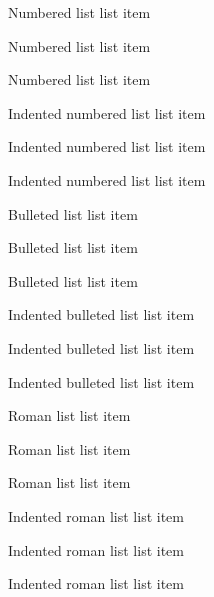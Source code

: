 \begin{numberedlist}
	\item Numbered list list item
    \item Numbered list list item
    \item Numbered list list item
\end{numberedlist}

\begin{numberedlist-indent}
	\item Indented numbered list list item
	\item Indented numbered list list item
	\item Indented numbered list list item
\end{numberedlist-indent}

\begin{bulletlist}
	\item Bulleted list list item
    \item Bulleted list list item
    \item Bulleted list list item
\end{bulletlist}

\begin{bulletlist-indent}
    \item Indented bulleted list list item
    \item Indented bulleted list list item
    \item Indented bulleted list list item
\end{bulletlist-indent}


\begin{romanlist}
    \item Roman list list item
    \item Roman list list item
    \item Roman list list item
\end{romanlist}

\begin{romanlist-indent}
    \item Indented roman list list item
    \item Indented roman list list item
    \item Indented roman list list item
\end{romanlist-indent}

